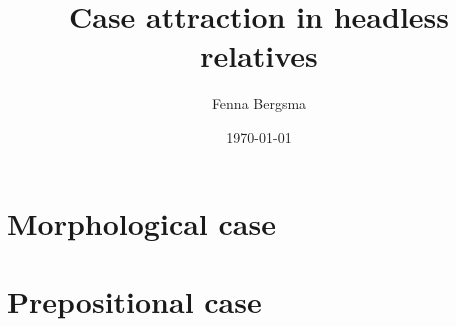 \documentclass{memoir}
\title{Case attraction in headless relatives}
\author{Fenna Bergsma}
\date{\today}
\begin{document}
\maketitle

\newpage
\tableofcontents



\part{Morphological case}


\part{Prepositional case}

\printbibliography
\end{document}
